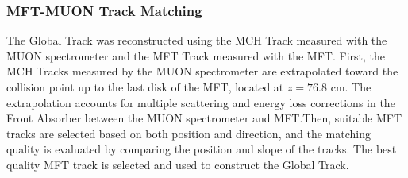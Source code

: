         \subsubsection{MFT-MUON Track Matching}\label{MFT-MUON_matching}
            The Global Track was reconstructed using the MCH Track measured with the MUON spectrometer and the MFT Track measured with the MFT. First, the MCH Tracks measured by the MUON spectrometer are extrapolated toward the collision point up to the last disk of the MFT, located at $z=76.8$ cm. The extrapolation accounts for multiple scattering and energy loss corrections in the Front Absorber between the MUON spectrometer and MFT.\@ Then, suitable MFT tracks are selected based on both position and direction, and the matching quality is evaluated by comparing the position and slope of the tracks. The best quality MFT track is selected and used to construct the Global Track.
